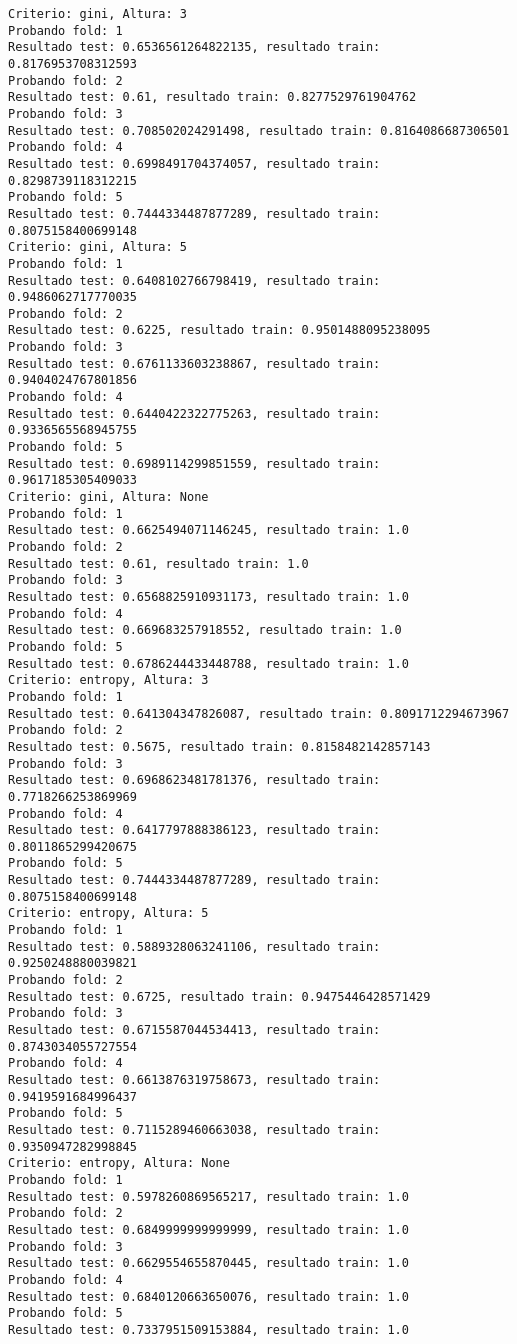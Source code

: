 \documentclass[11pt]{article}
\begin{document}
    \begin{Verbatim}[commandchars=\\\{\}]
Criterio: gini, Altura: 3
Probando fold: 1
Resultado test: 0.6536561264822135, resultado train: 0.8176953708312593
Probando fold: 2
Resultado test: 0.61, resultado train: 0.8277529761904762
Probando fold: 3
Resultado test: 0.708502024291498, resultado train: 0.8164086687306501
Probando fold: 4
Resultado test: 0.6998491704374057, resultado train: 0.8298739118312215
Probando fold: 5
Resultado test: 0.7444334487877289, resultado train: 0.8075158400699148
Criterio: gini, Altura: 5
Probando fold: 1
Resultado test: 0.6408102766798419, resultado train: 0.9486062717770035
Probando fold: 2
Resultado test: 0.6225, resultado train: 0.9501488095238095
Probando fold: 3
Resultado test: 0.6761133603238867, resultado train: 0.9404024767801856
Probando fold: 4
Resultado test: 0.6440422322775263, resultado train: 0.9336565568945755
Probando fold: 5
Resultado test: 0.6989114299851559, resultado train: 0.9617185305409033
Criterio: gini, Altura: None
Probando fold: 1
Resultado test: 0.6625494071146245, resultado train: 1.0
Probando fold: 2
Resultado test: 0.61, resultado train: 1.0
Probando fold: 3
Resultado test: 0.6568825910931173, resultado train: 1.0
Probando fold: 4
Resultado test: 0.669683257918552, resultado train: 1.0
Probando fold: 5
Resultado test: 0.6786244433448788, resultado train: 1.0
Criterio: entropy, Altura: 3
Probando fold: 1
Resultado test: 0.641304347826087, resultado train: 0.8091712294673967
Probando fold: 2
Resultado test: 0.5675, resultado train: 0.8158482142857143
Probando fold: 3
Resultado test: 0.6968623481781376, resultado train: 0.7718266253869969
Probando fold: 4
Resultado test: 0.6417797888386123, resultado train: 0.8011865299420675
Probando fold: 5
Resultado test: 0.7444334487877289, resultado train: 0.8075158400699148
Criterio: entropy, Altura: 5
Probando fold: 1
Resultado test: 0.5889328063241106, resultado train: 0.9250248880039821
Probando fold: 2
Resultado test: 0.6725, resultado train: 0.9475446428571429
Probando fold: 3
Resultado test: 0.6715587044534413, resultado train: 0.8743034055727554
Probando fold: 4
Resultado test: 0.6613876319758673, resultado train: 0.9419591684996437
Probando fold: 5
Resultado test: 0.7115289460663038, resultado train: 0.9350947282998845
Criterio: entropy, Altura: None
Probando fold: 1
Resultado test: 0.5978260869565217, resultado train: 1.0
Probando fold: 2
Resultado test: 0.6849999999999999, resultado train: 1.0
Probando fold: 3
Resultado test: 0.6629554655870445, resultado train: 1.0
Probando fold: 4
Resultado test: 0.6840120663650076, resultado train: 1.0
Probando fold: 5
Resultado test: 0.7337951509153884, resultado train: 1.0

    \end{Verbatim}
\end{document}
